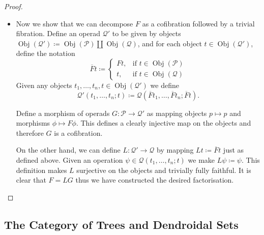 \documentclass[11pt, reqno]{amsart}
\theoremstyle{definition}
\newcommand{\disj}{\amalg}     %
\DeclareMathOperator{\Obj}{Obj}   %
\newcommand{\operad}{\mathcal}
\begin{document}
\begin{proof}
\begin{itemize}
        \item Now we show that we can decompose \(F\) as a cofibration followed
            by a trivial fibration. Define an operad \(\operad Q'\) to be given
            by objects \(\Obj(\operad Q') \coloneq \Obj(\operad P) \disj \Obj(\operad
            Q)\), and for each object \(t \in \Obj(\operad Q')\), define the notation
            \[
                \overline F t \coloneq
                \begin{cases}
                    F t, &\text{if } t \in \Obj(\operad P) \\
                    t,   &\text{if } t \in \Obj(\operad Q)
                \end{cases}
            \]
            Given any objects \(t_1, \dots, t_n, t \in \Obj(\operad Q')\) we define
            \[
                \operad Q'(t_1, \dots, t_n; t) \coloneq 
                \operad Q(\overline F t_1, \dots, \overline F t_n; \overline F t).
            \]

            Define a morphism of operads \(G: \operad P \to \operad Q'\) as
            mapping objects \(p \mapsto p\) and morphisms \(\phi \mapsto F
            \phi\). This defines a clearly injective map on the objects and
            therefore \(G\) is a cofibration.

            On the other hand, we can define \(L: \operad Q' \to \operad Q\) by
            mapping \(L t \coloneq \overline F t\) just as defined above. Given
            an operation \(\psi \in \operad Q(t_1, \dots, t_n; t)\) we make \(L
            \psi \coloneq \psi\). This definition makes \(L\) surjective on the
            objects and trivially fully faithful. It is clear that \(F = L G\)
            thus we have constructed the desired factorisation.
    \end{itemize}
\end{proof}

\subsection{The Category of Trees and Dendroidal Sets}
\end{document}

